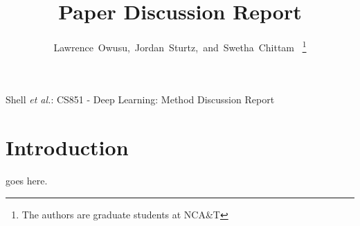 \documentclass[journal]{IEEEtran}
\begin{document}
%
\title{Paper Discussion Report}

\author{Lawrence~Owusu,~Jordan~Sturtz,~and~Swetha~Chittam~%
  \thanks{The authors are graduate students at NCA\&T}%
}

%

%
{Shell \MakeLowercase{\textit{et al.}}: CS851 - Deep Learning: Method Discussion Report}

\maketitle




%
\IEEEpeerreviewmaketitle

\section{Introduction}

%
 goes here.
\end{document}

